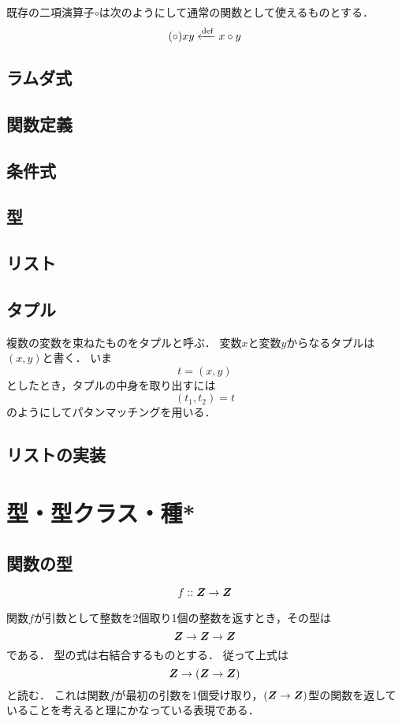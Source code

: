 \documentclass[twocolumn]{jsbook}
\begin{document}
既存の二項演算子$\circ$は次のようにして通常の関数として使えるものとする．
$$(\circ)xy\xleftarrow{\text{def}} x\circ y$$

\section{ラムダ式}

\section{関数定義}

\section{条件式}

\section{型}

\section{リスト}


\section{タプル}

複数の変数を束ねたものをタプルと呼ぶ．
変数$x$と変数$y$からなるタプルは$(x,y)$と書く．
いま$$t=(x,y)$$としたとき，タプルの中身を取り出すには$$(t_1,t_2)=t$$のようにしてパタンマッチングを用いる．

\section{リストの実装}


\chapter{型・型クラス・種*}

\section{関数の型}

$$f::\bm{Z}\rightarrow\bm{Z}$$

関数$f$が引数として整数を2個取り1個の整数を返すとき，その型は$$\bm{Z}\rightarrow\bm{Z}\rightarrow\bm{Z}$$である．
型の式は右結合するものとする．
従って上式は$$\bm{Z}\rightarrow\left(\bm{Z}\rightarrow\bm{Z}\right)$$と読む．
これは関数$f$が最初の引数を1個受け取り，$(\bm{Z}\rightarrow\bm{Z})$型の関数を返していることを考えると理にかなっている表現である．
\end{document}
